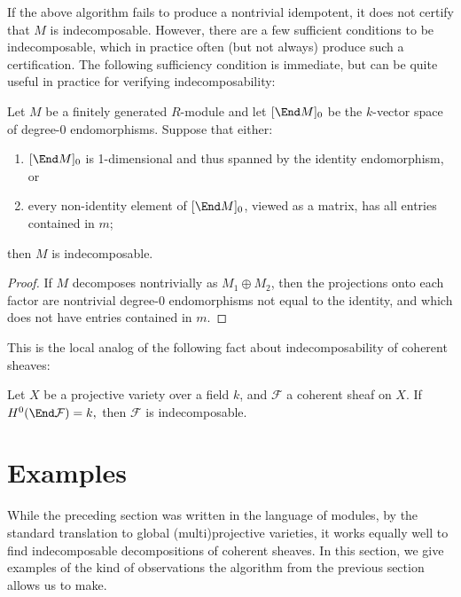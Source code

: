 \documentclass{article}
\def\F{\mathcal F}
\numberwithin{equation}{section}
\theoremstyle{theorem}
\numberwithin{thm}{section}
\theoremstyle{definition}
\begin{document}
If the above algorithm fails to produce a nontrivial idempotent, it does not certify that $M$ is indecomposable. However, there are a few sufficient conditions to be indecomposable, which in practice often (but not always) produce such a certification.
The following sufficiency condition is immediate, but can be quite useful in practice for verifying indecomposability:

\begin{lem}
  Let $M$ be a finitely generated $R$-module and let $[\End M]_0$ be the $k$-vector space of degree-0 endomorphisms. Suppose that either:
  \begin{enumerate}
  \item $[\End M]_0$ is 1-dimensional and thus spanned by the identity endomorphism, or
  \item every non-identity element of $[\End M]_0$, viewed as a matrix, has all entries contained in $m$;
  \end{enumerate}
  then $M$ is indecomposable.
\end{lem}
\begin{proof}
  If $M$ decomposes nontrivially as $M_1\oplus M_2$, then the projections onto each factor are nontrivial degree-0 endomorphisms not equal to the identity, and which does not have entries contained in $m$.
\end{proof}

This is the local analog of the following fact about indecomposability of coherent sheaves:

\begin{cor}
  Let $X$ be a projective variety over a field $k$, and $\F$ a coherent sheaf on $X$.
  If $ H^0(\End \F) = k, $ then $\F$ is indecomposable.
\end{cor}


\section{Examples}

While the preceding section was written in the language of modules, by the standard translation to global (multi)projective varieties, it works equally well to find indecomposable decompositions of coherent sheaves.
In this section, we give examples of the kind of observations the algorithm from the previous section allows us to make.

\renewcommand{\char}{\operatorname{char}}
\end{document}
